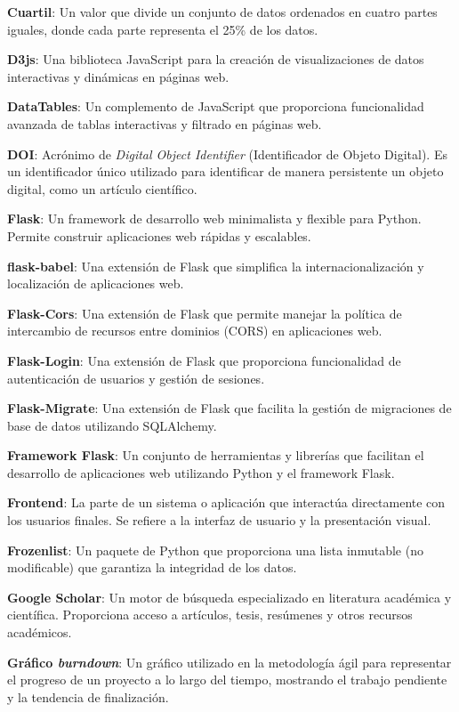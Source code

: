 \textbf{Cuartil}: Un valor que divide un conjunto de datos ordenados en cuatro partes iguales, donde cada parte representa el 25\% de los datos.

\textbf{D3js}: Una biblioteca JavaScript para la creación de visualizaciones de datos interactivas y dinámicas en páginas web.

\textbf{DataTables}: Un complemento de JavaScript que proporciona funcionalidad avanzada de tablas interactivas y filtrado en páginas web.

\textbf{DOI}: Acrónimo de \textit{Digital Object Identifier} (Identificador de Objeto Digital). Es un identificador único utilizado para identificar de manera persistente un objeto digital, como un artículo científico.

\textbf{Flask}: Un framework de desarrollo web minimalista y flexible para Python. Permite construir aplicaciones web rápidas y escalables.

\textbf{flask-babel}: Una extensión de Flask que simplifica la internacionalización y localización de aplicaciones web.

\textbf{Flask-Cors}: Una extensión de Flask que permite manejar la política de intercambio de recursos entre dominios (CORS) en aplicaciones web.

\textbf{Flask-Login}: Una extensión de Flask que proporciona funcionalidad de autenticación de usuarios y gestión de sesiones.

\textbf{Flask-Migrate}: Una extensión de Flask que facilita la gestión de migraciones de base de datos utilizando SQLAlchemy.

\textbf{Framework Flask}: Un conjunto de herramientas y librerías que facilitan el desarrollo de aplicaciones web utilizando Python y el framework Flask.

\textbf{Frontend}: La parte de un sistema o aplicación que interactúa directamente con los usuarios finales. Se refiere a la interfaz de usuario y la presentación visual.

\textbf{Frozenlist}: Un paquete de Python que proporciona una lista inmutable (no modificable) que garantiza la integridad de los datos.

\textbf{Google Scholar}: Un motor de búsqueda especializado en literatura académica y científica. Proporciona acceso a artículos, tesis, resúmenes y otros recursos académicos.

\textbf{Gráfico \textit{burndown}}: Un gráfico utilizado en la metodología ágil para representar el progreso de un proyecto a lo largo del tiempo, mostrando el trabajo pendiente y la tendencia de finalización.

